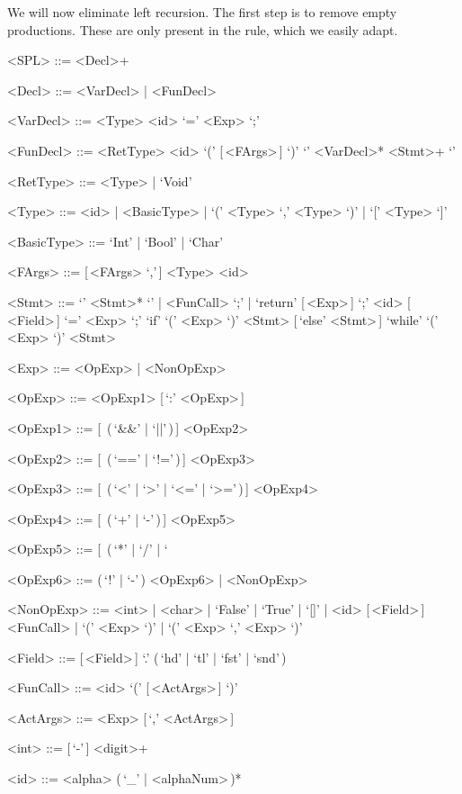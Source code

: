 \documentclass{article}
\begin{document}
We will now eliminate left recursion.
The first step is to remove empty productions.
These are only present in the  rule, which we easily adapt.
\begin{grammar}
    <SPL> ::= <Decl>+

    <Decl> ::= <VarDecl> | <FunDecl>

    <VarDecl> ::= <Type> <id> `=' <Exp> `;'

    <FunDecl> ::= <RetType> <id> `(' [\,<FArgs>\,] `)' `{' <VarDecl>* <Stmt>+ `}'

    <RetType> ::= <Type> | `Void'

    <Type> ::= <id> | <BasicType> | `(' <Type> `,' <Type> `)' | `[' <Type> `]'

    <BasicType> ::= `Int' | `Bool' | `Char'

    <FArgs> ::= [\,<FArgs> `,'\,] <Type> <id>

    <Stmt> ::= `{' <Stmt>* `}' | <FunCall> `;' | `return' [\,<Exp>\,] `;'
    \alt <id> [\,<Field>\,] `=' <Exp> `;'
    \alt `if' `(' <Exp> `)' <Stmt> [\,`else' <Stmt>\,]
    \alt `while' `(' <Exp> `)' <Stmt>

    <Exp> ::= <OpExp> | <NonOpExp>

    <OpExp> ::= <OpExp1> [\,`:' <OpExp>\,]

    <OpExp1> ::= [\,<OpExp1> (\,`&&' | `||'\,)\,] <OpExp2>

    <OpExp2> ::= [\,<OpExp2> (\,`==' | `!='\,)\,] <OpExp3>

    <OpExp3> ::= [\,<OpExp3> (\,`<' | `>' | `<=' | `>='\,)\,] <OpExp4>

    <OpExp4> ::= [\,<OpExp4> (\,`+' | `-'\,)\,] <OpExp5>

    <OpExp5> ::= [\,<OpExp5> (\,`*' | `/' | `%

    <OpExp6> ::= (\,`!' | `-'\,) <OpExp6> | <NonOpExp>

    <NonOpExp> ::= <int> | <char> | `False' | `True' | `[]' | <id> [\,<Field>\,]
    \alt <FunCall> | `(' <Exp> `)' | `(' <Exp> `,' <Exp> `)'

    <Field> ::= [\,<Field>\,] `.' (\,`hd' | `tl' | `fst' | `snd'\,)

    <FunCall> ::= <id> `(' [\,<ActArgs>\,] `)'

    <ActArgs> ::= <Exp> [\,`,' <ActArgs>\,]

    <int> ::= [\,`-'\,] <digit>+

    <id> ::= <alpha> (\,`_' | <alphaNum>\,)*
\end{grammar}
\end{document}
